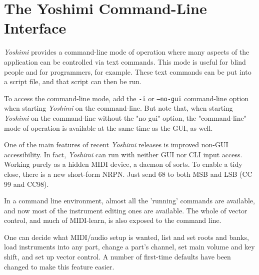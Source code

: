 %
%
%

\section{The Yoshimi Command-Line Interface}
\label{sec:command_line}

   \textsl{Yoshimi} provides a command-line mode of operation
   where many aspects of the application can be controlled via text commands.
   This mode is useful for blind people and for programmers, for example.
   These text commands can be put into a script file, and that script can then
   be run.

   To access the command-line mode,
   add the \texttt{-i} or \texttt{--no-gui} command-line
   option when starting \textsl{Yoshimi} on the command-line.  But note that,
   when starting \textsl{Yoshimi} on the command-line without the "no gui"
   option, the "command-line" mode
   of operation is available at the same time as the GUI, as well.

   One of the main features of recent \textsl{Yoshimi} releases
   is improved non-GUI accessibility.  In fact,
   \textsl{Yoshimi} can run with neither GUI nor CLI input access. Working
   purely as a hidden MIDI device, a daemon of sorts. To enable a tidy close,
   there is a new short-form NRPN. Just send 68 to both MSB and LSB (CC 99 and
   CC98).

   In a command line environment, almost all the 'running' commands are
   available, and now most of the instrument editing ones are available.
   The whole of vector control, and much of MIDI-learn, is also exposed to the
   command line.

   One can decide what MIDI/audio setup is wanted, list and set roots and
   banks, load instruments into any part, change a part's channel, set main
   volume and key shift, and set up vector control.  A number of first-time
   defaults have been changed to make this feature easier.

